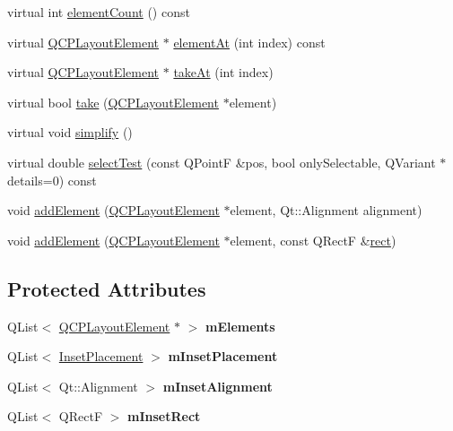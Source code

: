 \begin{DoxyCompactItemize}
\item 
virtual int \hyperlink{classQCPLayoutInset_a2087b97b9266fd9e0f571a8d3cf709f9}{element\+Count} () const 
\item 
virtual \hyperlink{classQCPLayoutElement}{Q\+C\+P\+Layout\+Element} $\ast$ \hyperlink{classQCPLayoutInset_ab096d07b08f9b5455647f3ba7ff60e27}{element\+At} (int index) const 
\item 
virtual \hyperlink{classQCPLayoutElement}{Q\+C\+P\+Layout\+Element} $\ast$ \hyperlink{classQCPLayoutInset_ad6756a3b507e20496aaf7f5ca16c47d1}{take\+At} (int index)
\item 
virtual bool \hyperlink{classQCPLayoutInset_a9ac707ccff650633b97f52dd5cddcf49}{take} (\hyperlink{classQCPLayoutElement}{Q\+C\+P\+Layout\+Element} $\ast$element)
\item 
virtual void \hyperlink{classQCPLayoutInset_abb9eb23bf2d7c587a8abe02d065eae0a}{simplify} ()
\item 
virtual double \hyperlink{classQCPLayoutInset_ab5a2f2b88c05e369fd7da9583d17aa3a}{select\+Test} (const Q\+Point\+F \&pos, bool only\+Selectable, Q\+Variant $\ast$details=0) const 
\item 
void \hyperlink{classQCPLayoutInset_ad61529eb576af7f04dff94abb10c745a}{add\+Element} (\hyperlink{classQCPLayoutElement}{Q\+C\+P\+Layout\+Element} $\ast$element, Qt\+::\+Alignment alignment)
\item 
void \hyperlink{classQCPLayoutInset_a8ff61fbee4a1f0ff45c398009d9f1e56}{add\+Element} (\hyperlink{classQCPLayoutElement}{Q\+C\+P\+Layout\+Element} $\ast$element, const Q\+Rect\+F \&\hyperlink{classQCPLayoutElement_affdfea003469aac3d0fac5f4e06171bc}{rect})
\end{DoxyCompactItemize}
\subsection*{Protected Attributes}
\begin{DoxyCompactItemize}
\item 
\hypertarget{classQCPLayoutInset_a8fff7eae9a1be9a5c1e544fb379f682f}{}Q\+List$<$ \hyperlink{classQCPLayoutElement}{Q\+C\+P\+Layout\+Element} $\ast$ $>$ {\bfseries m\+Elements}\label{classQCPLayoutInset_a8fff7eae9a1be9a5c1e544fb379f682f}

\item 
\hypertarget{classQCPLayoutInset_a57a0a4e445cc78eada29765ecf092abe}{}Q\+List$<$ \hyperlink{classQCPLayoutInset_a8b9e17d9a2768293d2a7d72f5e298192}{Inset\+Placement} $>$ {\bfseries m\+Inset\+Placement}\label{classQCPLayoutInset_a57a0a4e445cc78eada29765ecf092abe}

\item 
\hypertarget{classQCPLayoutInset_a55e9b84c310136ff985a6544184ab64a}{}Q\+List$<$ Qt\+::\+Alignment $>$ {\bfseries m\+Inset\+Alignment}\label{classQCPLayoutInset_a55e9b84c310136ff985a6544184ab64a}

\item 
\hypertarget{classQCPLayoutInset_aaa8f6b5029458f3d97a65239524a2b33}{}Q\+List$<$ Q\+Rect\+F $>$ {\bfseries m\+Inset\+Rect}\label{classQCPLayoutInset_aaa8f6b5029458f3d97a65239524a2b33}

\end{DoxyCompactItemize}
